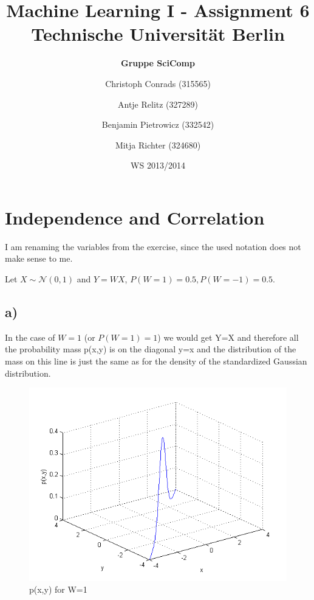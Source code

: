 \documentclass[paper=a4,fontsize=10pt,DIV11,BCOR10mm]{scrartcl}
\begin{document}
\title{Machine Learning I - Assignment 6\\
\small{Technische Universität Berlin}}


\author{\hspace{5cm}\textbf{Gruppe SciComp}\hspace{5cm} \and
	\small{Christoph Conrads (315565)} \and
	\small{Antje Relitz (327289)} \and
	\small{Benjamin Pietrowicz (332542)} \and
	\small{Mitja Richter (324680)}
}

\date{WS 2013/2014}

\maketitle


\section{Independence and Correlation}

I am renaming the variables from the exercise, since the used notation does not make sense to me.

Let $X\sim\mathcal{N}(0,1)$ and $Y=WX$, $P(W=1)=0.5, P(W=-1)=0.5$.

\subsection*{a)}
In the case of $W=1$ (or $P(W=1)=1$) we would get Y=X and therefore all the probability mass p(x,y) is on the diagonal y=x and the distribution of the mass on this line is just the same as for the density of the standardized Gaussian distribution.
\begin{figure}[htb]
\includegraphics[scale=0.6]{prob_dist_wpos.png}
\caption{p(x,y) for W=1}
\end{figure}
\FloatBarrier
\end{document}
